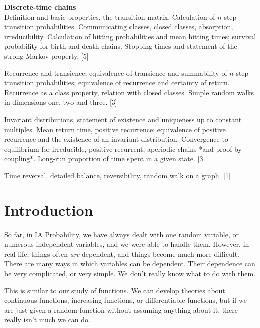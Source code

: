 \documentclass[a4paper]{article}
\begin{document}
\maketitle
{\small
\noindent\textbf{Discrete-time chains}\\
Definition and basic properties, the transition matrix. Calculation of $n$-step transition probabilities. Communicating classes, closed classes, absorption, irreducibility. Calculation of hitting probabilities and mean hitting times; survival probability for birth and death chains. Stopping times and statement of the strong Markov property.\hspace*{\fill} [5]

\vspace{5pt}
\noindent Recurrence and transience; equivalence of transience and summability of $n$-step transition probabilities; equivalence of recurrence and certainty of return. Recurrence as a class property, relation with closed classes. Simple random walks in dimensions one, two and three.\hspace*{\fill} [3]

\vspace{5pt}
\noindent Invariant distributions, statement of existence and uniqueness up to constant multiples. Mean return time, positive recurrence; equivalence of positive recurrence and the existence of an invariant distribution. Convergence to equilibrium for irreducible, positive recurrent, aperiodic chains *and proof by coupling*. Long-run proportion of time spent in a given state.\hspace*{\fill} [3]

\vspace{5pt}
\noindent Time reversal, detailed balance, reversibility, random walk on a graph.\hspace*{\fill} [1]}

\tableofcontents
\setcounter{section}{-1}
\section{Introduction}
So far, in IA Probability, we have always dealt with one random variable, or numerous independent variables, and we were able to handle them. However, in real life, things often \emph{are} dependent, and things become much more difficult. There are many ways in which variables can be dependent. Their dependence can be very complicated, or very simple. We don't really know what to do with them.

This is similar to our study of functions. We can develop theories about continuous functions, increasing functions, or differentiable functions, but if we are just given a random function without assuming anything about it, there really isn't much we can do.
\end{document}
